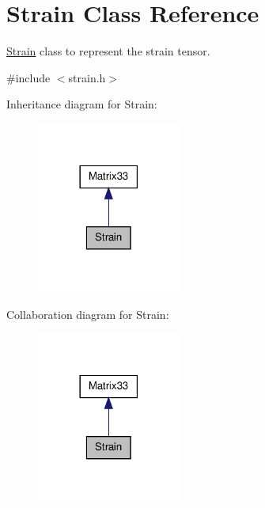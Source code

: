 \hypertarget{classStrain}{\section{\-Strain \-Class \-Reference}
\label{d1/d3c/classStrain}
}


\hyperlink{classStrain}{\-Strain} class to represent the strain tensor.  




{\ttfamily \#include $<$strain.\-h$>$}



\-Inheritance diagram for \-Strain\-:
\nopagebreak
\begin{figure}[H]
\begin{center}
\leavevmode
\includegraphics[width=134pt]{d6/d0f/classStrain__inherit__graph}
\end{center}
\end{figure}


\-Collaboration diagram for \-Strain\-:
\nopagebreak
\begin{figure}[H]
\begin{center}
\leavevmode
\includegraphics[width=134pt]{db/db8/classStrain__coll__graph}
\end{center}
\end{figure}
